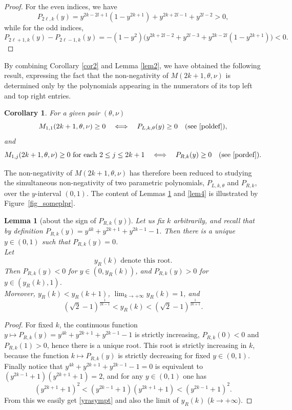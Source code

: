 \documentclass[smallextended,numbook,runningheads]{svjour3}     %
\newtheorem{lemma}{Lemma}
\newtheorem{corollary}{Corollary}
\newtheorem{lemma}{Lemma}
\newtheorem{corollary}{Corollary}
\newcommand{\te}{\theta}
\newcommand{\yr}{y_R(k)}
\newcommand{\Por}{P_{R,k}(y)}
\newcommand{\Pol}{P_{L,k,\te}(y)}
\begin{document}
\begin{proof} For the even indices, we have
\[
P_{2\ell,k}(y)=y^{2 k-2 l+1}(1-y^{2 k+1})+y^{2 k+2 l-1}+y^{2 l-2}>0,\]
while for the odd indices,
\[
P_{2\ell+1,k}(y)-P_{2\ell-1,k}(y)=-(1 - y^2)\Big(y^{2 k+2 l-2}+y^{2 l-3}+y^{2 k-2 l}(1-y^{2k+1})\Big)<0.
\] 
\end{proof}
By combining Corollary \ref{cor2} and Lemma \ref{lem2}, we have obtained the following result, expressing the fact that the non-negativity of $M(2k+1,\te,\nu)$ is determined only by the polynomials appearing in the numerators of its top left and top right entries.
\begin{corollary}\label{cor3} For a given pair $(\te,\nu)$
\[
M_{1,1}(2k+1,\te,\nu)\ge 0 \quad \Longleftrightarrow \quad \Pol\ge 0 \quad \text{(see } \eqref{poldef}\text{)},
\]
and
\[
M_{1,j}(2k+1,\te,\nu)\ge 0 \text{  for each } 2\le j\le 2k+1 \quad \Longleftrightarrow \quad
\Por\ge 0\quad\text{(see }\eqref{pordef}\text{)}.
\]
\end{corollary}
The non-negativity of $M(2k+1,\te,\nu)$ has therefore been reduced to studying the simultaneous non-negativity of two parametric polynomials, $P_{L,k,\te}$ and $P_{R,k}$, over the $y$-interval $(0,1)$. The content of Lemmas \ref{lem3} and \ref{lem4} is illustrated by Figure~\ref{fig_someplpr}.
\begin{lemma}[about the sign of $\Por$]\label{lem3}
Let us fix $k$ arbitrarily, and recall that by definition $\Por=y^{4 k}+y^{2 k+1}+y^{2 k-1}-1$. Then there is a unique $y\in(0,1)$ such that $\Por=0$.\\ 
Let 
\begin{equation}\label{yrdef}\yr \text{ denote this root.}\end{equation} 
Then $\Por<0$ for $y\in(0,\yr)$, and $\Por>0$ for $y\in(\yr,1)$.\\
Moreover, $\yr<y_R(k+1)$, $\lim_{k\to+\infty} \yr=1$, and
\begin{equation}\label{yrasympt}
\left(\sqrt{2}-1\right)^{\frac{1}{2 k-1}}<\yr < \left(\sqrt{2}-1\right)^{\frac{1}{2 k+1}}.
\end{equation}
\end{lemma}
\begin{proof}
For fixed $k$, the continuous function $y\mapsto\Por=y^{4 k}+y^{2 k+1}+y^{2 k-1}-1$ is strictly increasing, 
$P_{R,k}(0)<0$ and $P_{R,k}(1)>0$, hence there is a unique root. This root is strictly increasing in $k$, because the function $k\mapsto\Por$ is strictly decreasing for fixed $y\in(0,1)$. Finally notice that 
$y^{4 k}+y^{2 k+1}+y^{2 k-1}-1=0$ is equivalent to $\left(y^{2 k-1}+1\right) \left(y^{2 k+1}+1\right)=2$,
and for any $y\in(0,1)$ one has
\[
\left(y^{2 k+1}+1\right)^2<\left(y^{2 k-1}+1\right) \left(y^{2 k+1}+1\right)<\left(y^{2 k-1}+1\right)^2.
\]
From this we easily get \eqref{yrasympt} and also the limit of $\yr$ ($k\to +\infty$).
\end{proof}
\end{document}
